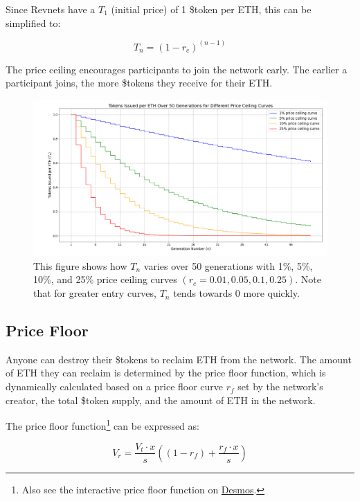 \documentclass{article}
\begin{document}
Since Revnets have a $T_1$ (initial price) of 1 \$token per ETH, this can be simplified to:

\begin{equation}
  T_n = (1 - r_c)^{(n - 1)}
\end{equation}

The price ceiling encourages participants to join the network early. The earlier a participant joins, the more \$tokens they receive for their ETH.

\begin{figure}[h]
  \centering
  \includegraphics[width=\textwidth]{figures/multi-ceiling-curves.png}
  \caption{This figure shows how $T_n$ varies over 50 generations with 1\%, 5\%, 10\%, and 25\% price ceiling curves $(r_c = 0.01, 0.05, 0.1, 0.25)$. Note that for greater entry curves, $T_n$ tends towards 0 more quickly.}
\end{figure}

\subsection{Price Floor}

Anyone can destroy their \$tokens to reclaim ETH from the network. The amount of ETH they can reclaim is determined by the price floor function, which is dynamically calculated based on a price floor curve $r_f$ set by the network's creator, the total \$token supply, and the amount of ETH in the network.

The price floor function\footnote{Also see the interactive price floor function on \href{https://www.desmos.com/calculator/9pewqesyj5}{Desmos}.} can be expressed as:

\begin{equation}
  V_r = \frac{V_t \cdot x}{s}\left(\left(1-r_f\right)+\frac{r_f \cdot x}{s}\right)
\end{equation}
\end{document}
